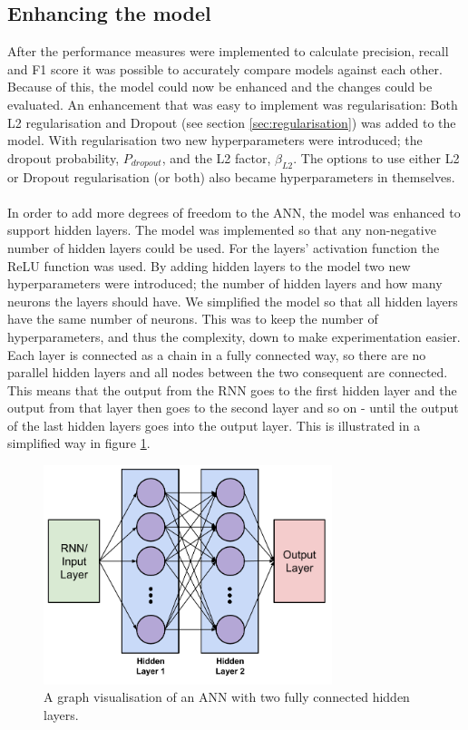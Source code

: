\subsection{Enhancing the model}
After the performance measures were implemented to calculate precision, recall and F1 score it was possible to accurately compare models against each other. Because of this, the model could now be enhanced and the changes could be evaluated. An enhancement that was easy to implement was regularisation: Both L2 regularisation and Dropout (see section \ref{sec:regularisation}) was added to the model. With regularisation two new hyperparameters were introduced; the dropout probability, $P_{dropout}$, and the L2 factor, $\beta_{L2}$. The options to use either L2 or Dropout regularisation (or both) also became hyperparameters in themselves.
\\\\
In order to add more degrees of freedom to the ANN, the model was enhanced to support hidden layers. The model was implemented so that any non-negative number of hidden layers could be used. For the layers' activation function the ReLU function was used. By adding hidden layers to the model two new hyperparameters were introduced; the number of hidden layers and how many neurons the layers should have. We simplified the model so that all hidden layers have the same number of neurons. This was to keep the number of hyperparameters, and thus the complexity, down to make experimentation easier. Each layer is connected as a chain in a fully connected way, so there are no parallel hidden layers and all nodes between the two consequent are connected. This means that the output from the RNN goes to the first hidden layer and the output from that layer then goes to the second layer and so on - until the output of the last hidden layers goes into the output layer. This is illustrated in a simplified way in figure \ref{fig:ann_hidden_layers}.
\begin{figure}[h]
    \centering
    \includegraphics[width=0.75\textwidth]{figure/method/ann_hidden_layers}
    \caption{A graph visualisation of an ANN with two fully connected hidden layers.}
    \label{fig:ann_hidden_layers}
\end{figure}
